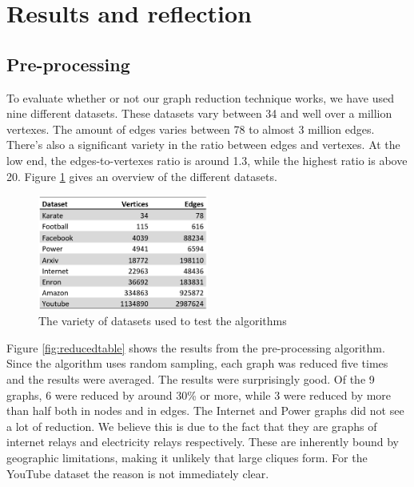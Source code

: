 \section{Results and reflection}
\label{chapter:results}
\subsection{Pre-processing}
To evaluate whether or not our graph reduction technique works, we have used nine different datasets. These datasets vary between 34 and well over a million vertexes. The amount of edges varies between 78 to almost 3 million edges. There's also a significant variety in the ratio between edges and vertexes. At the low end, the edges-to-vertexes ratio is around 1.3, while the highest ratio is above 20. Figure \ref{fig:datasets} gives an overview of the different datasets.

\begin{figure}[H]
\begin{center}
\includegraphics[width=0.5\textwidth]{images/datasets.png}
\caption{The variety of datasets used to test the algorithms}\label{fig:datasets}
\end{center}
\end{figure}

Figure \ref{fig:reducedtable} shows the results from the pre-processing algorithm. Since the algorithm uses random sampling, each graph was reduced five times and the results were averaged. The results were surprisingly good. Of the 9 graphs, 6 were reduced by around 30\% or more, while 3 were reduced by more than half both in nodes and in edges. The Internet and Power graphs did not see a lot of reduction. We believe this is due to the fact that they are graphs of internet relays and electricity relays respectively. These are inherently bound by geographic limitations, making it unlikely that large cliques form. For the YouTube dataset the reason is not immediately clear.

